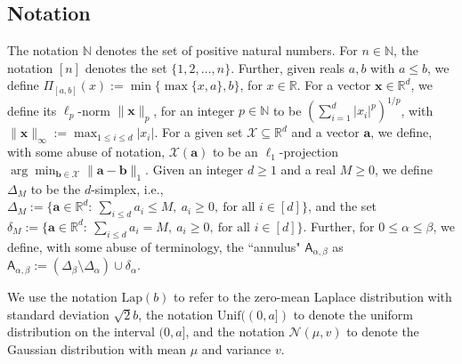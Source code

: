 \label{sec:prelim}
\subsection{Notation}
The notation $\mathbb{N}$ denotes the set of positive natural numbers. For $n\in \mathbb{N}$, the notation $[n]$ denotes the set $\{1,2,\ldots,n\}$. 
Further, given reals $a,b$ with $a\leq b$, we define $\Pi_{[a,b]}(x):= \min\{\max\{x,a\},b\}$, for $x\in \mathbb{R}$. For a vector $\mathbf{x}\in \mathbb{R}^d$, we define its $\ell_p$-norm $\lVert \mathbf{x}\rVert_p$, for an integer $p\in \mathbb{N}$ to be $(\sum_{i=1}^d |x_i|^p)^{1/p}$, with $\lVert \mathbf{x}\rVert_\infty:= \max_{1\leq i\leq d} |x_i|$. For a given set $\mathcal{X}\subseteq \mathbb{R}^d$ and a vector $\mathbf{a}$, we define, with some abuse of notation, $\mathcal{X}(\mathbf{a})$ to be an $\ell_1$-projection $\arg \min_{\mathbf{b}\in \mathcal{X}} \lVert \mathbf{a}-\mathbf{b}\rVert_1$. Given an integer $d\geq 1$ and a real $M\geq 0$, we define $\Delta_M$ to be the $d$-simplex, i.e., $\Delta_M:= \{\mathbf{a}\in \mathbb{R}^d:\ \sum_{i\leq d} a_i\leq M,\ a_i\geq 0,\ \text{for all $i\in [d]$}\}$, and the set $\delta_M:= \{\mathbf{a}\in \mathbb{R}^d:\ \sum_{i\leq d} a_i= M,\ a_i\geq 0,\ \text{for all $i\in [d]$}\}$. Further, for $0\leq \alpha\leq \beta$, we define, with some abuse of terminology, the ``annulus" $\mathsf{A}_{\alpha,\beta}$ as $\mathsf{A}_{\alpha,\beta}:= (\Delta_\beta \setminus \Delta_\alpha) \cup \delta_\alpha$. 

We use the notation $\text{Lap}(b)$ to refer to the zero-mean Laplace distribution with standard deviation $\sqrt{2}b$, the notation $\text{Unif}((0,a])$ to denote the uniform distribution on the interval $(0,a]$, and the notation $\mathcal{N}(\mu, v)$ to denote the Gaussian distribution with mean $\mu$ and variance $v$.

